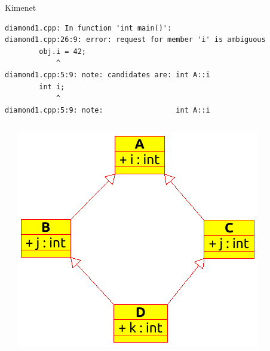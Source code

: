 \begin{frame}[fragile]
    \begin{block}{Kimenet}
        \vspace{-.3cm}
        \begin{verbatim}
diamond1.cpp: In function 'int main()':
diamond1.cpp:26:9: error: request for member 'i' is ambiguous
        obj.i = 42;
            ^
diamond1.cpp:5:9: note: candidates are: int A::i
        int i;
            ^
diamond1.cpp:5:9: note:                 int A::i   
        \end{verbatim}
        \vspace{-.6cm}
    \end{block}
\end{frame}

\begin{frame}
    \begin{columns}[]
            \begin{exampleblock}{}
                
            \end{exampleblock}
            \begin{center}
                \includegraphics[scale=0.8]{diamond2.eps}
            \end{center}
    \end{columns}
\end{frame}